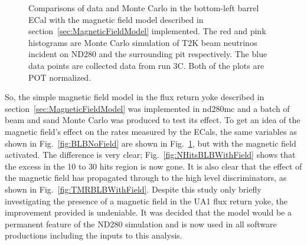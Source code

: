 \begin{figure}[bottom]%
  \centering
  \caption{Comparisons of data and Monte Carlo in the bottom-left barrel ECal with the magnetic field model described in section~\ref{sec:MagneticFieldModel} implemented.  The red and pink histograms are Monte Carlo simulation of T2K beam neutrinos incident on ND280 and the surrounding pit respectively.  The blue data points are collected data from run 3C.  Both of the plots are POT normalized.}
  \label{fig:BLBWithField}
\end{figure}
So, the simple magnetic field model in the flux return yoke described in section~\ref{sec:MagneticFieldModel} was implemented in nd280mc and a batch of beam and sand Monte Carlo was produced to test its effect.  To get an idea of the magnetic field's effect on the rates measured by the ECals, the same variables as shown in Fig.~\ref{fig:BLBNoField} are shown in Fig.~\ref{fig:BLBWithField}, but with the magnetic field activated.  The difference is very clear; Fig.~\ref{fig:NHitsBLBWithField} shows that the excess in the 10 to 30 hits region is now gone.  It is also clear that the effect of the magnetic field has propagated through to the high level discriminators, as shown in Fig.~\ref{fig:TMRBLBWithField}.
\newline
\newline
Despite this study only briefly investigating the presence of a magnetic field in the UA1 flux return yoke, the improvement provided is undeniable.  It was decided that the model would be a permanent feature of the ND280 simulation and is now used in all software productions including the inputs to this analysis.

